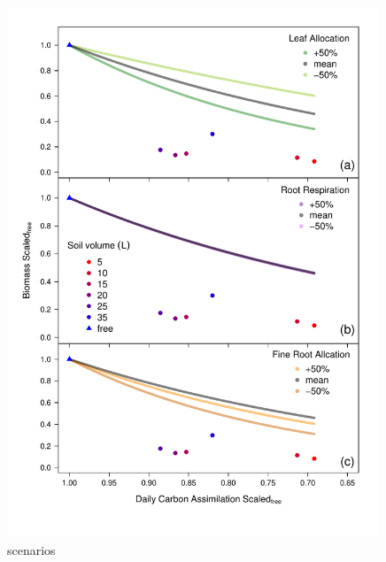 \documentclass[a4paper]{article}\usepackage[]{graphicx}\usepackage[]{color}
\begin{document}
\begin{figure}[h!]
    \centering
    \includegraphics[width=0.99\textwidth]{gc_Day_scenario.pdf}
    \caption{scenarios}
    \label{fig:figureSI1}
\end{figure}
\clearpage

\end{document}
